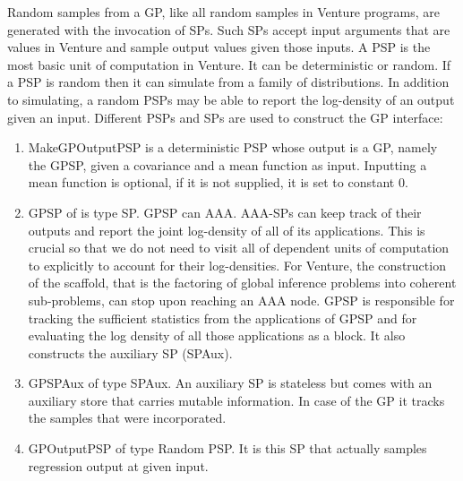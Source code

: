 Random samples from a \ac{GP}, like all random samples in Venture programs,
are generated with the invocation of \ac{SP}s.
Such \ac{SP}s accept input arguments that are values in Venture and sample output
values given those inputs. A \ac{PSP} is the most basic unit of computation in
Venture. It can be deterministic or random. If a \ac{PSP} is random then it can simulate from a family of
distributions. In addition to simulating,
a random PSPs may be able to report the log-density of an output given an input.
Different \ac{PSP}s and \ac{SP}s are used to construct the \ac{GP} interface:
\begin{enumerate}
\item MakeGPOutputPSP is a deterministic PSP whose output is a \ac{GP}, namely the
GPSP, given a
covariance and a mean function as input. Inputting a mean function is optional,
if it is not supplied, it is set to constant 0.

\item GPSP of is type SP. GPSP can \ac{AAA}. \ac{AAA}-\ac{SP}s can keep track of
their outputs and report
the joint log-density of all of its applications. This is crucial so that we do
not need to visit all of dependent units of computation to explicitly to account for their
log-densities. For Venture, the construction of the scaffold, that is the
factoring of global inference problems into coherent sub-problems, can stop upon
reaching an \ac{AAA} node. GPSP is responsible for tracking the sufficient statistics
from the applications of GPSP and for evaluating the log density of all those
applications as a block. It also constructs the auxiliary SP (SPAux).
\item GPSPAux of type SPAux. An auxiliary SP is stateless but comes with an auxiliary
store that carries mutable information. In case of the \ac{GP} it tracks the
samples that were incorporated.
\item GPOutputPSP of type Random PSP.  It is this SP that actually samples
regression output at given input.
\end{enumerate}





